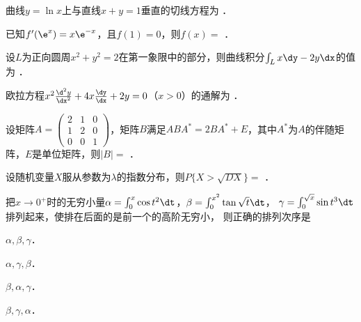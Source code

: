 \documentclass[plain,noanswer,medmath]{../../template/jnuexam}
\begin{document}




\begin{problem}
曲线$y = \ln x$上与直线$x + y = 1$垂直的切线方程为 \fillin{}．
\end{problem}


\begin{problem}
已知$f'(\e^x) = x\e^{- x}$，且$f(1) = 0$，则$f(x) =$ \fillin{}．
\end{problem}


\begin{problem}
设$L$为正向圆周$x^2 + y^2 = 2$在第一象限中的部分，则曲线积分$\int_L x\dy - 2y\dx$的值为 \fillin{}．
\end{problem}


\begin{problem}
欧拉方程$x^2\frac{\d^2y}{\dx^2} + 4x\frac{\dy}{\dx} + 2y = 0$（$x > 0$）的通解为 \fillin{}．
\end{problem}


\begin{problem}
设矩阵$A = \begin{pmatrix}
  2 & 1 & 0 \\
  1 & 2 & 0 \\
  0 & 0 & 1
\end{pmatrix}$，矩阵$B$满足$AB A^* = 2BA^* + E$，其中$A^*$为$A$的伴随矩阵，$E$是单位矩阵，则$|B| =$ \fillin{}．
\end{problem}


\begin{problem}
设随机变量$X$服从参数为$\lambda$的指数分布，则$P\{X > \sqrt{DX}\} =$ \fillin{}．
\end{problem}




\begin{problem}
把$x \to 0^+$时的无穷小量$\alpha = \int_0^x \cos t^2 \dt$，$\beta = \int_0^{x^2} \tan \sqrt{t} \dt$，
$\gamma = \int_0^{\sqrt{x}} \sin t^3 \dt$排列起来，使排在后面的是前一个的高阶无穷小，
则正确的排列次序是\pickout{}
\begin{abcd}
\item $\alpha ,\beta ,\gamma$．
\item $\alpha ,\gamma ,\beta$．
\item $\beta ,\alpha ,\gamma$．
\item $\beta ,\gamma ,\alpha$．
\end{abcd}
\end{problem}
\end{document}
